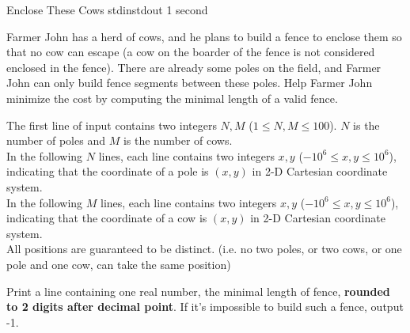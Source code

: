 \begin{problem}{Enclose These Cows}
{stdin}{stdout}
{1 second}{}{}

Farmer John has a herd of cows, and he plans to build a fence to enclose them so that no cow can escape (a cow on the boarder of the fence is not considered enclosed in the fence). There are already some poles on the field, and Farmer John can only build fence segments between these poles. Help Farmer John minimize the cost by computing the minimal length of a valid fence. 

\InputFile

The first line of input contains two integers $N, M$ ($1 \le N, M \le 100$). $N$ is the number of poles and $M$ is the number of cows. \\
In the following $N$ lines, each line contains two integers $x, y$ ($-10^6 \le x, y \le 10^6$), indicating that the coordinate of a pole is $(x, y)$ in 2-D Cartesian coordinate system. \\
In the following $M$ lines, each line contains two integers $x, y$ ($-10^6 \le x, y \le 10^6$), indicating that the coordinate of a cow is $(x, y)$ in 2-D Cartesian coordinate system. \\
All positions are guaranteed to be distinct. (i.e. no two poles, or two cows, or one pole and one cow, can take the same position)

\OutputFile

Print a line containing one real number, the minimal length of fence, \textbf{rounded to 2 digits after decimal point}. If it's impossible to build such a fence, output -1. 

\Examples

\begin{example}
%
%
\end{example}

\end{problem}

